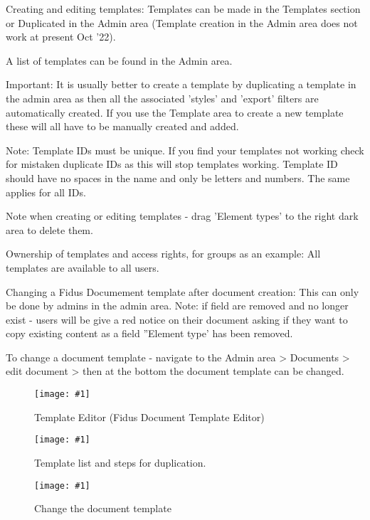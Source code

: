 \documentclass{article}
\newlength{\imgwidth}
\newcommand\scaledgraphics[2]{%
                
\settowidth{\imgwidth}{\texttt{[image: \#1]}}%
                
\setlength{\imgwidth}{\minof{\imgwidth}{#2\textwidth}}%
                
\texttt{[image: \#1]}%
                
}
\begin{document}
Creating and editing templates: Templates can be made in the Templates section or Duplicated in the Admin area (Template creation in the Admin area does not work at present Oct '22).


A list of templates can be found in the Admin area.


Important: It is usually better to create a template by duplicating a template in the admin area as then all the associated 'styles' and 'export' filters are automatically created. If you use the Template area to create a new template these will all have to be manually created and added.


Note: Template IDs must be unique. If you find your templates not working check for mistaken duplicate IDs as this will stop templates working. Template ID should have no spaces in the name and only be letters and numbers. The same applies for all IDs.


Note when creating or editing templates - drag 'Element types' to the right dark area to delete them.


Ownership of templates and access rights, for groups as an example: All templates are available to all users.


Changing a Fidus Documement template after document creation: This can only be done by admins in the admin area. Note: if field are removed and no longer exist - users will be give a red notice on their document asking if they want to copy existing content as a field ''Element type' has been removed.


To change a document template - navigate to the Admin area > Documents > edit document > then at the bottom the document template can be changed.

\begin{figure}
\scaledgraphics{d82287ad-ca23-4e31-bba4-48f5c62c4703.png}{1}
\caption*{Template Editor (Fidus Document Template Editor)}\label{F45095451}
\end{figure}




\begin{figure}
\scaledgraphics{87596dc1-f0fb-4bd1-ac74-8f5f19f2ba84.png}{1}
\caption*{Template list and steps for duplication.}\label{F78763991}
\end{figure}

\begin{figure}
\scaledgraphics{3d3d12e4-5986-44e6-bbe5-6fd4f0ad11ba.png}{1}
\caption*{Change the document template}\label{F64774031}
\end{figure}
\end{document}
